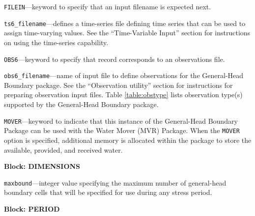 \begin{description}
\item \texttt{FILEIN}---keyword to specify that an input filename is expected next.

\item \texttt{ts6\_filename}---defines a time-series file defining time series that can be used to assign time-varying values. See the ``Time-Variable Input'' section for instructions on using the time-series capability.

\item \texttt{OBS6}---keyword to specify that record corresponds to an observations file.

\item \texttt{obs6\_filename}---name of input file to define observations for the General-Head Boundary package. See the ``Observation utility'' section for instructions for preparing observation input files. Table \ref{table:obstype} lists observation type(s) supported by the General-Head Boundary package.

\item \texttt{MOVER}---keyword to indicate that this instance of the General-Head Boundary Package can be used with the Water Mover (MVR) Package.  When the \texttt{MOVER} option is specified, additional memory is allocated within the package to store the available, provided, and received water.

\end{description}
\item \textbf{Block: DIMENSIONS}

\begin{description}
\item \texttt{maxbound}---integer value specifying the maximum number of general-head boundary cells that will be specified for use during any stress period.

\end{description}
\item \textbf{Block: PERIOD}

